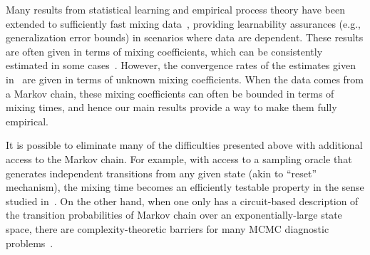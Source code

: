 Many results from statistical learning and empirical process theory
have been extended to sufficiently fast mixing
data~\citep[e.g.,][]{Yu94,MR1921877,gamarnik03,MoRo08,MoRo09,DBLP:conf/nips/SteinwartC09,Steinwart2009175},
providing learnability assurances (e.g., generalization error bounds)
in scenarios where data are dependent.
These results are often given in terms of mixing coefficients, which
can be consistently estimated in some cases~\citet{McDoShaSche11}.
However, the convergence rates of the estimates given
in~\citet{McDoShaSche11} are given in terms of unknown mixing
coefficients.
When the data comes from a Markov chain, these mixing coefficients can
often be bounded in terms of mixing times, and hence our main results
provide a way to make them fully empirical.

It is possible to eliminate many of the difficulties presented above
with additional access to the Markov chain.
For example, with access to a sampling oracle that generates
independent transitions from any given state (akin to ``reset''
mechanism), the mixing time becomes an efficiently testable property
in the sense studied in~\citet{BaFoRuSmiWhi00,BaFoRuSmiWhi13}.
On the other hand, when one only has a circuit-based description of
the transition probabilities of Markov chain over an
exponentially-large state space, there are complexity-theoretic
barriers for many MCMC diagnostic problems~\citet{BhaBoMo11}.

